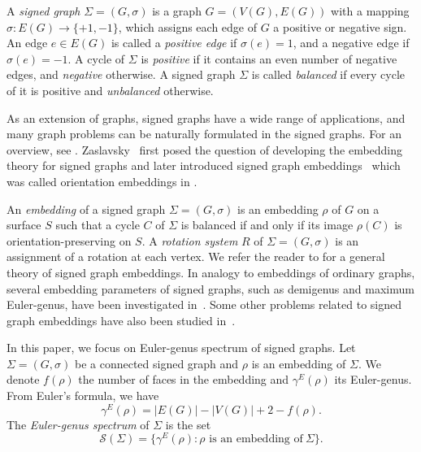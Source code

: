 \documentclass[10pt,a4paper]{amsart}
\begin{document}
A {\it signed graph} $\Sigma=(G,\sigma)$ is a graph $G=(V(G), E(G))$  with a mapping $\sigma:E(G)\longrightarrow\{+1,-1\}$, which assigns each edge of $G$ a positive or negative sign.  An edge $e\in E(G)$ is called a {\it positive edge} if $\sigma(e)=1$, and a negative edge if $\sigma(e)=-1$.
A cycle of $\Sigma$ is {\it positive} if it contains an even number of negative edges, and {\it negative} otherwise.
A signed graph $\Sigma$ is called {\it balanced} if every cycle of it is positive and {\it unbalanced} otherwise.

As an extension of graphs, signed graphs have a wide range of applications, and many graph problems can be naturally formulated in the signed graphs. For an overview, see \cite{Zaslavsky1998}.  Zaslavsky~\cite{Zaslavsky1981} first posed the question of developing the embedding theory for signed graphs and later introduced signed graph embeddings~\cite{Zaslavsky1992} which was called orientation embeddings in \cite{Zaslavsky1992}.

An {\it embedding}  of a signed graph $\Sigma=(G,\sigma)$ is an embedding $\rho$ of $G$ on a surface $S$ such that a cycle $C$ of $\Sigma$ is balanced if and only if its image $\rho(C)$ is orientation-preserving on $S$.   A {\it rotation system} $R$ of  $\Sigma=(G,\sigma)$ is an assignment of a rotation at each vertex. We refer the reader to \cite{Zaslavsky1992} for a general theory of signed graph embeddings. In analogy to embeddings of ordinary graphs, several embedding parameters of signed graphs, such as demigenus and maximum Euler-genus, have been investigated in~\cite{Lv2015,Lv2018,SiranSkoviera1991,Zaslavsky1997,Zaslavsky2001}. Some other problems related to signed graph embeddings have also been studied in~\cite{Siran1991-1,Zaslavsky1993,Zaslavsky1996,Zaslavsky1997-1}.

In this paper, we focus on Euler-genus spectrum of signed graphs. Let $\Sigma=(G,\sigma)$ be a connected signed graph and $\rho$ is an embedding of $\Sigma$.
We denote $f(\rho)$ the number of faces in the embedding and $\gamma^E(\rho)$ its Euler-genus. From Euler's formula, we have
\[
\gamma^E(\rho)
=|E(G)|-|V(G)|+2-f(\rho).
\]
The \textit{Euler-genus spectrum} of $\Sigma$ is the set
\[
\mathcal{S}(\Sigma)
=\{\gamma^E(\rho):
\rho\text{ is an embedding of}~ \Sigma\}.
\]
\end{document}
